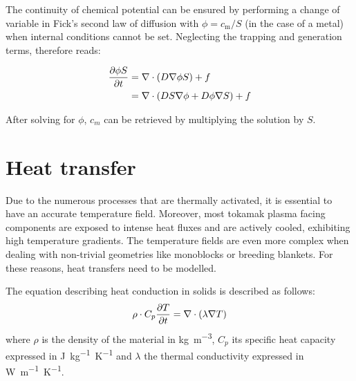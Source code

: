 The continuity of chemical potential can be ensured by performing a change of variable in Fick's second law of diffusion with $\phi = c_\mathrm{m}/S$ (in the case of a metal)  when internal conditions cannot be set.
Neglecting the trapping and generation terms,  therefore reads:

\begin{align}
    \frac{\partial \phi S}{\partial t} &= \nabla \cdot\left(D \nabla \phi S\right) + f \nonumber \\
    &=\nabla \cdot\left( D S \nabla \phi + D \phi \nabla S\right) + f \labeq{diffusion equation changed}
\end{align}



After solving  for $\phi$, $c_m$ can be retrieved by multiplying the solution by $S$.

\section{Heat transfer}
Due to the numerous processes that are thermally activated, it is essential to have an accurate temperature field.
Moreover, most tokamak plasma facing components are exposed to intense heat fluxes and are actively cooled, exhibiting high temperature gradients.
The temperature fields are even more complex when dealing with non-trivial geometries like monoblocks or breeding blankets.
For these reasons, heat transfers need to be modelled.

The equation describing heat conduction in solids is described as follows:
\begin{equation}
    \rho \cdot C_p \frac{\partial T}{\partial t}=\nabla \cdot (\lambda \nabla T)
    \labeq{heat equation}
\end{equation}
where $\rho$ is the density of the material in \si{kg.m^{-3}}, $C_p$ its specific heat capacity expressed in \si{J.kg^{-1}.K^{-1}} and $\lambda$ the thermal conductivity expressed in \si{W.m^{-1}.K^{-1}}.

